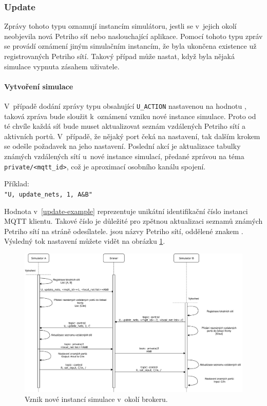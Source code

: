 \subsubsection{Update}

Zprávy tohoto typu oznamují instancím simulátoru, jestli se v~jejich okolí neobjevila nová Petriho síť nebo naslouchající aplikace. Pomocí tohoto typu zpráv se provádí oznámení jiným simulačním instancím, že byla ukončena existence už registrovaných Petriho sítí. Takový případ může nastat, když byla nějaká simulace vypnuta zásahem uživatele.

\paragraph{Vytvoření simulace}

V~případě dodání zprávy typu  obsahující \texttt{U\_ACTION} nastavenou na hodnotu , taková zpráva bude sloužit k~oznámení vzniku nové instance simulace. Proto od té chvíle každá síť bude muset aktualizovat seznám vzdálených Petriho sítí a aktivních portů. V~případě, že nějaký port čeká na nastavení, tak dalším krokem se odešle požadavek na jeho nastavení. Poslední akcí je aktualizace tabulky známých vzdálených sítí u~nové instance simulací, předané zprávou na téma \texttt{private/<mqtt\_id>}, což je aproximací osobního kanálu spojení.

\begin{tabbing}
  \label{update-example}
  Příklad: \= \\
  \>\texttt{"U, update\_nets, 1, A\&B"}
\end{tabbing}

Hodnota  v~\ref{update-example} reprezentuje unikátní identifikační číslo instanci MQTT klientu. Takové číslo je důležité pro zpětnou aktualizaci seznamů známých Petriho sítí na stráně odesílatele.  jsou názvy Petriho sítí, oddělené znakem \uv{\texttt{\&}}. Výsledný tok nastavení můžete vidět na obrázku \ref{sim-register-viz}.

\begin{figure}[hbt]
  \centering
  \includegraphics[width=1\textwidth]{obrazky-figures/sim-register.pdf}
  \caption{Vznik nové instancí simulace v~okolí brokeru.}
  \label{sim-register-viz}
\end{figure}


